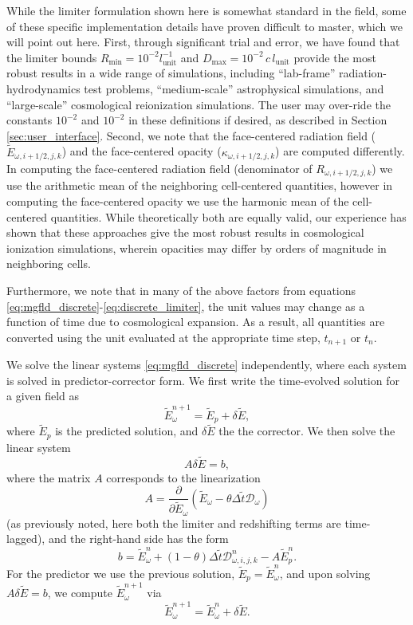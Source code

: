 \documentclass[10pt]{article}
\renewcommand{\(}{\left(}
\renewcommand{\)}{\right)}
\newcommand{\mD}{{\mathcal D}}
\newcommand{\Lunit}{l_{\text{unit}}}
\newcommand{\tT}{\tilde{t}}
\newcommand{\tE}{\tilde{E}}
\begin{document}
While the limiter formulation shown here is somewhat standard in the
field, some of these specific implementation details have proven
difficult to master, which we will point out here.  First, through
significant trial and error, we have found that the limiter
bounds $R_\text{min}=10^{-2} \Lunit^{-1}$ and 
$D_\text{max}=10^{-2}\, c\, \Lunit$ provide the most robust results
in a wide range of simulations, including ``lab-frame''
radiation-hydrodynamics test problems, ``medium-scale'' astrophysical
simulations, and ``large-scale'' cosmological reionization
simulations.  The user may over-ride the constants $10^{-2}$ and
$10^{-2}$ in these definitions if desired, as described in Section
\ref{sec:user_interface}.  Second, we note that the face-centered
radiation field ($\tE_{\omega,i+1/2,j,k}$) and the face-centered
opacity ($\kappa_{\omega,i+1/2,j,k}$) are computed differently.  In
computing the face-centered radiation field (denominator of
$R_{\omega,i+1/2,j,k}$) we use the arithmetic mean of the neighboring 
cell-centered quantities, however in computing the face-centered
opacity we use the harmonic mean of the cell-centered quantities.
While theoretically both are equally valid, our experience has shown
that these approaches give the most robust results in cosmological
ionization simulations, wherein opacities may differ by orders of
magnitude in neighboring cells.

Furthermore, we note that in many of the above factors from equations
\eqref{eq:mgfld_discrete}-\eqref{eq:discrete_limiter}, the unit
values may change as a function of time due to cosmological expansion.
As a result, all quantities are converted using the unit evaluated at
the appropriate time step, $t_{n+1}$ or $t_n$.

We solve the linear systems \eqref{eq:mgfld_discrete} independently,
where each system is solved in predictor-corrector form.  We first
write the time-evolved solution for a given field as 
\[
  \tE_{\omega}^{n+1} = \tE_{p} + \delta\tE,
\]
where $\tE_p$ is the predicted solution, and $\delta\tE$ the the
corrector.  We then solve the linear system 
\begin{equation}
\label{eq:linear_system}
   A \delta\tE = b,
\end{equation}
where the matrix $A$ corresponds to the linearization
\[
   A = \frac{\partial}{\partial\tE_{\omega}} \left(\tE_{\omega} - \theta\Delta \tT \mD_{\omega}\right)
\]
(as previously noted, here both the limiter and redshifting terms are
time-lagged), and the right-hand side has the form
\[
  b = \tE_{\omega}^n + (1-\theta)\Delta \tT \mD_{\omega,i,j,k}^{n} - A\tE_{p}^n.
\]
For the predictor we use the previous solution, $\tE_p =
\tE_{\omega}^n$, and upon solving $A \delta\tE = b$, we compute
$\tE_{\omega}^{n+1}$ via
\[
  \tE_{\omega}^{n+1} = \tE_{\omega}^n + \delta\tE.
\]
\end{document}
